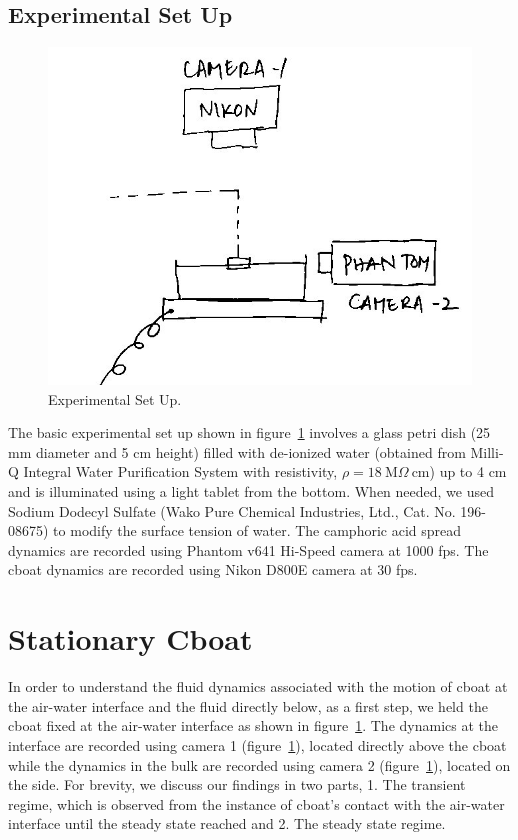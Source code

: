\documentclass[aps,twocolumn, floatfix, superscriptaddress]{revtex4}
\begin{document}
\subsection{Experimental Set Up}
\label{sec:expset}
\begin{figure}[ht]
    \begin{center}
       \includegraphics[scale=0.25]{figure1.jpg}
    \end{center}
    \caption{Experimental Set Up.}
    \label{fig:expset}
\end{figure}
The basic experimental set up shown in figure~\ref{fig:expset} involves a glass petri dish (25 mm diameter and 5 cm height) filled with de-ionized water (obtained from Milli-Q Integral Water Purification System with resistivity, $\rho=\mathrm{18\ M} \Omega\ \mathrm{cm}$) up to 4 cm and is illuminated using a light tablet from the bottom. When needed, we used Sodium Dodecyl Sulfate (Wako Pure Chemical Industries, Ltd., Cat. No. 196-08675) to modify the surface tension of water. The camphoric acid spread dynamics are recorded using Phantom v641 Hi-Speed camera at 1000 fps. The cboat dynamics are recorded using Nikon D800E camera at 30 fps. 
\section{Stationary Cboat}
In order to understand the fluid dynamics associated with the motion of cboat at the air-water interface and the fluid directly below, as a first step, we held the cboat fixed at the air-water interface as shown in figure~\ref{fig:expset}. The dynamics at the interface are recorded using camera 1 (figure~\ref{fig:expset}), located directly above the cboat while the dynamics in the bulk are recorded using camera 2 (figure~\ref{fig:expset}), located on the side. For brevity, we discuss our findings in two parts, 1. The transient regime, which is observed from the instance of cboat's contact with the air-water interface until the steady state reached and 2. The steady state regime. 
\end{document}
